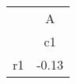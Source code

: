 \begin{tabular}{l*{1}{c}}
\hline\hline
            &           A\\
            &          c1\\
\hline
r1          &       -0.13\\
\hline\hline
\end{tabular}
